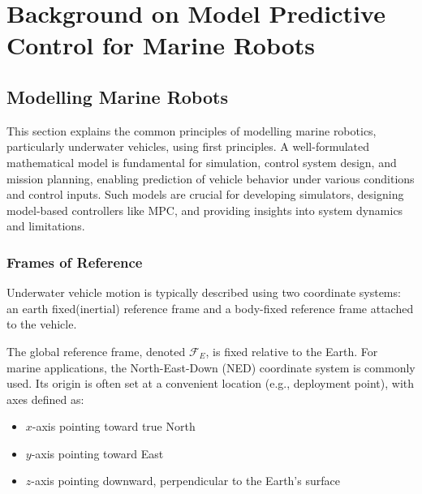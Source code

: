 




\chapter{Background on Model Predictive Control for Marine Robots}
\label{ch:background}
\section{Modelling Marine Robots}
\label{sec:modelling}

This section explains the common principles of modelling marine robotics, particularly underwater vehicles, using first principles. A well-formulated mathematical model is fundamental for simulation, control system design, and mission planning, enabling prediction of vehicle behavior under various conditions and control inputs. Such models are crucial for developing simulators, designing model-based controllers like MPC, and providing insights into system dynamics and limitations.

\subsection{Frames of Reference}
Underwater vehicle motion is typically described using two coordinate systems: an earth fixed(inertial) reference frame and a body-fixed reference frame attached to the vehicle.

The global reference frame, denoted $\mathcal{F}_E$, is fixed relative to the Earth. For marine applications, the North-East-Down (NED) coordinate system is commonly used. Its origin is often set at a convenient location (e.g., deployment point), with axes defined as:
\begin{itemize}
    \item $x$-axis pointing toward true North
    \item $y$-axis pointing toward East
    \item $z$-axis pointing downward, perpendicular to the Earth's surface
\end{itemize}


